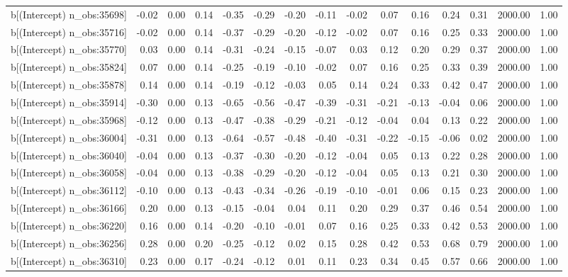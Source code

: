 \begin{table}[ht]
\begin{tabular}{rrrrrrrrrrrrrrr}
  b[(Intercept) n\_obs:35698] & -0.02 & 0.00 & 0.14 & -0.35 & -0.29 & -0.20 & -0.11 & -0.02 & 0.07 & 0.16 & 0.24 & 0.31 & 2000.00 & 1.00 \\ 
  b[(Intercept) n\_obs:35716] & -0.02 & 0.00 & 0.14 & -0.37 & -0.29 & -0.20 & -0.12 & -0.02 & 0.07 & 0.16 & 0.25 & 0.33 & 2000.00 & 1.00 \\ 
  b[(Intercept) n\_obs:35770] & 0.03 & 0.00 & 0.14 & -0.31 & -0.24 & -0.15 & -0.07 & 0.03 & 0.12 & 0.20 & 0.29 & 0.37 & 2000.00 & 1.00 \\ 
  b[(Intercept) n\_obs:35824] & 0.07 & 0.00 & 0.14 & -0.25 & -0.19 & -0.10 & -0.02 & 0.07 & 0.16 & 0.25 & 0.33 & 0.39 & 2000.00 & 1.00 \\ 
  b[(Intercept) n\_obs:35878] & 0.14 & 0.00 & 0.14 & -0.19 & -0.12 & -0.03 & 0.05 & 0.14 & 0.24 & 0.33 & 0.42 & 0.47 & 2000.00 & 1.00 \\ 
  b[(Intercept) n\_obs:35914] & -0.30 & 0.00 & 0.13 & -0.65 & -0.56 & -0.47 & -0.39 & -0.31 & -0.21 & -0.13 & -0.04 & 0.06 & 2000.00 & 1.00 \\ 
  b[(Intercept) n\_obs:35968] & -0.12 & 0.00 & 0.13 & -0.47 & -0.38 & -0.29 & -0.21 & -0.12 & -0.04 & 0.04 & 0.13 & 0.22 & 2000.00 & 1.00 \\ 
  b[(Intercept) n\_obs:36004] & -0.31 & 0.00 & 0.13 & -0.64 & -0.57 & -0.48 & -0.40 & -0.31 & -0.22 & -0.15 & -0.06 & 0.02 & 2000.00 & 1.00 \\ 
  b[(Intercept) n\_obs:36040] & -0.04 & 0.00 & 0.13 & -0.37 & -0.30 & -0.20 & -0.12 & -0.04 & 0.05 & 0.13 & 0.22 & 0.28 & 2000.00 & 1.00 \\ 
  b[(Intercept) n\_obs:36058] & -0.04 & 0.00 & 0.13 & -0.38 & -0.29 & -0.20 & -0.12 & -0.04 & 0.05 & 0.13 & 0.21 & 0.30 & 2000.00 & 1.00 \\ 
  b[(Intercept) n\_obs:36112] & -0.10 & 0.00 & 0.13 & -0.43 & -0.34 & -0.26 & -0.19 & -0.10 & -0.01 & 0.06 & 0.15 & 0.23 & 2000.00 & 1.00 \\ 
  b[(Intercept) n\_obs:36166] & 0.20 & 0.00 & 0.13 & -0.15 & -0.04 & 0.04 & 0.11 & 0.20 & 0.29 & 0.37 & 0.46 & 0.54 & 2000.00 & 1.00 \\ 
  b[(Intercept) n\_obs:36220] & 0.16 & 0.00 & 0.14 & -0.20 & -0.10 & -0.01 & 0.07 & 0.16 & 0.25 & 0.33 & 0.42 & 0.53 & 2000.00 & 1.00 \\ 
  b[(Intercept) n\_obs:36256] & 0.28 & 0.00 & 0.20 & -0.25 & -0.12 & 0.02 & 0.15 & 0.28 & 0.42 & 0.53 & 0.68 & 0.79 & 2000.00 & 1.00 \\ 
  b[(Intercept) n\_obs:36310] & 0.23 & 0.00 & 0.17 & -0.24 & -0.12 & 0.01 & 0.11 & 0.23 & 0.34 & 0.45 & 0.57 & 0.66 & 2000.00 & 1.00 \\ 

\end{tabular}
\end{table}
